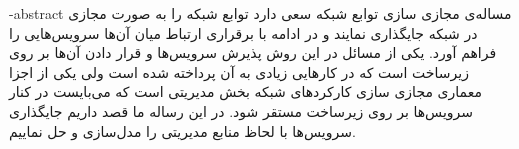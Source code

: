 
\fa-abstract{
    مساله‌ی مجازی سازی توابع شبکه سعی دارد توابع شبکه را به صورت مجازی در شبکه جایگذاری نمایند و در ادامه
    با برقراری ارتباط میان آن‌ها سرویس‌هایی را فراهم آورد.
    یکی از مسائل در این روش پذیرش سرویس‌ها و قرار دادن آن‌ها بر روی زیرساخت است
    که در کارهایی زیادی به آن پرداخته شده است ولی یکی از اجزا معماری مجازی سازی کارکردهای
    شبکه بخش مدیریتی است که می‌بایست در کنار سرویس‌ها بر روی زیرساخت مستقر شود.
    در این رساله ما قصد داریم جایگذاری سرویس‌ها با لحاظ منابع مدیریتی را
    مدل‌سازی و حل نماییم.
}





\AUTtitle
